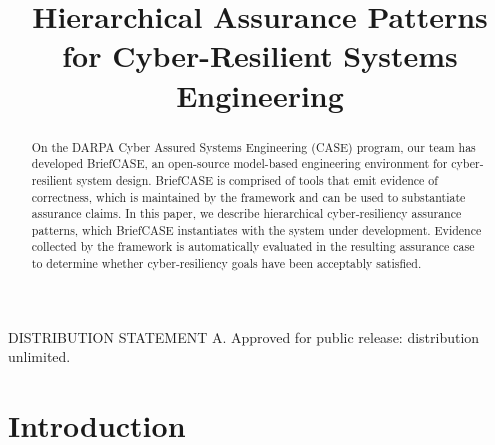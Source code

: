 \documentclass[conference]{IEEEtran}
\begin{document}
\title{Hierarchical Assurance Patterns for Cyber-Resilient Systems Engineering}

%

\author{
	}


\maketitle

\begin{abstract}

On the DARPA Cyber Assured Systems Engineering (CASE) program, our team has developed BriefCASE, an open-source model-based engineering environment for cyber-resilient system design.  BriefCASE is comprised of tools that emit evidence of correctness, which is maintained by the framework and can be used to substantiate assurance claims.  
In this paper, we describe hierarchical cyber-resiliency assurance patterns, which BriefCASE instantiates with the system under development. Evidence collected by the framework is automatically evaluated in the resulting assurance case to determine whether cyber-resiliency goals have been acceptably satisfied.

\end{abstract}

DISTRIBUTION STATEMENT A. Approved for public release: distribution unlimited.

\section{Introduction}
\label{sec:introduction}

\end{document}
